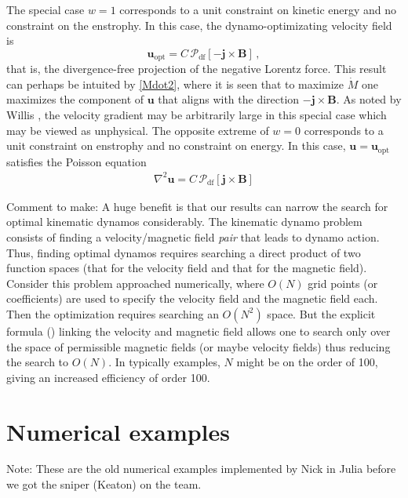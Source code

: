 \documentclass[onecolumn,showpacs,preprintnumbers,amsmath,amssymb]{revtex4-2}
\newcommand{\nick}[1]{{\color{orange}#1}}
\newcommand{\vsp}[1]{\vspace{#1 pc} \noindent}
\newcommand{\bvec}[1]{{\mathbf{#1}}}
\newcommand{\grad}{\nabla}
\newcommand{\uu}{\bvec{u}}
\newcommand{\uopt}{\uu_{\text{opt}}}
\newcommand{\Bvec}{\bvec{B}}
\newcommand{\jvec}{\bvec{j}}
\newcommand{\weight}{w}
\newcommand{\proj}{ \mathcal{P}_{\text{df}} }
\begin{document}
The special case $\weight=1$ corresponds to a unit constraint on kinetic energy and no constraint on the enstrophy. In this case, the dynamo-optimizating velocity field is 
\begin{equation}
\uopt = C \, \proj \left[ - \jvec \times \Bvec \right] \, ,
\end{equation}
that is, the divergence-free projection of the negative Lorentz force. This result can perhaps be intuited by \cref{Mdot2}, where it is seen that to maximize $\dot{M}$ one maximizes the component of $\uu$ that aligns with the direction $- \jvec \times \Bvec$. As noted by Willis \cite{Willis2012}, the velocity gradient may be arbitrarily large in this special case which may be viewed as unphysical.
%
The opposite extreme of $\weight = 0$ corresponds to a unit constraint on enstrophy and no constraint on energy. In this case, $\uu = \uopt$ satisfies the Poisson equation
\begin{align}
\grad^2 \uu = C \, \proj \left[ \jvec \times \Bvec \right]
\end{align}


\vsp{5}

\nick{Comment to make:}
A huge benefit is that our results can narrow the search for optimal kinematic dynamos considerably. The kinematic dynamo problem consists of finding a velocity/magnetic field {\em pair} that leads to dynamo action. Thus, finding optimal dynamos requires searching a direct product of two function spaces (that for the velocity field and that for the magnetic field). Consider this problem approached numerically, where $O(N)$ grid points (or coefficients) are used to specify the velocity field and the magnetic field each. Then the optimization requires searching an $O(N^2)$ space. But the explicit formula () linking the velocity and magnetic field allows one to search only over the space of permissible magnetic fields (or maybe velocity fields) thus reducing the search to $O(N)$. In typically examples, $N$ might be on the order of 100, giving an increased efficiency of order 100.



\newpage
\section{Numerical examples}

Note: These are the old numerical examples implemented by Nick in Julia before we got the sniper (Keaton) on the team.
\end{document}
